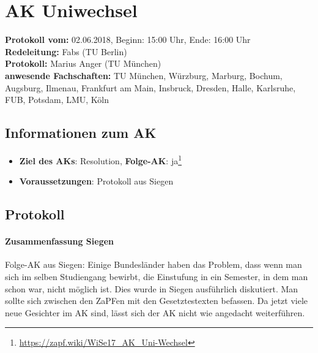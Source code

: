 \newpage
\section{AK Uniwechsel}

  \textbf{Protokoll vom:} 02.06.2018, %
  Beginn: 15:00 Uhr,
  Ende: 16:00 Uhr \\
  \textbf{Redeleitung:} Fabs (TU Berlin) \\
  \textbf{Protokoll:} Marius Anger (TU München) \\
  \textbf{anwesende Fachschaften:} TU München, Würzburg, Marburg, Bochum, Augsburg, Ilmenau, Frankfurt am Main, Insbruck, Dresden, Halle, Karlsruhe, FUB, Potsdam, LMU, Köln
\vspace{-5mm}
  \subsection*{Informationen zum AK}
    \begin{itemize}
      \item \textbf{Ziel des AKs}: Resolution, \textbf{Folge-AK}: ja\footnote{\url{https://zapf.wiki/WiSe17_AK_Uni-Wechsel}}
      \item \textbf{Voraussetzungen}: Protokoll aus Siegen
    \end{itemize}

  \subsection*{Protokoll}
      \paragraph{Zusammenfassung Siegen}
        Folge-AK aus Siegen: Einige Bundesländer haben das Problem, dass wenn man sich im selben Studiengang bewirbt, die Einstufung in ein Semester, in dem man schon war, nicht möglich ist.
        Dies wurde in Siegen ausführlich diskutiert. Man sollte sich zwischen den ZaPFen mit den Gesetztestexten befassen. Da jetzt viele neue Gesichter im AK sind, lässt sich der AK nicht wie angedacht weiterführen.

